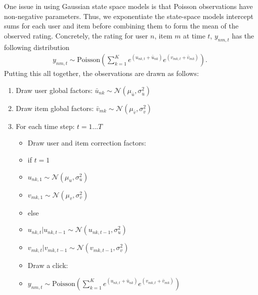 \documentclass{sig-alternate}
\begin{document}
One issue in using Gaussian state space models is that Poisson observations 
have non-negative parameters. Thus, we exponentiate 
the state-space models intercept sums for each user and item
before combining them to form the mean of the observed rating.
Concretely, the rating for user $n$, item $m$ at time $t$, $y_{nm,t}$
has the following distribution
\begin{align*}
y_{nm,t}\sim\text{Poisson}(\sum_{k=1}^K e^{(u_{nk,t} + \bar{u}_{nk})} e^{(v_{mk,t} + \bar{v}_{mk})}).
\end{align*}
Putting this
all together, the observations are
drawn as follows:  
\begin{enumerate}
\item Draw user global factors: $\bar{u}_{nk} \sim \mathcal{N}(\mu_{\bar{u}},\sigma_{\bar{u}}^2)$
\item Draw item global factors: $\bar{v}_{mk} \sim \mathcal{N}(\mu_{\bar{v}},\sigma_{\bar{v}}^2)$
\item For each time step: $t=1\ldots T$
\begin{itemize}
\item[] \hspace{-0.25in}Draw user and item correction factors: \item[] \hspace{-0.20in}if $t=1$
\item[] \hspace{-0.20in}\hspace{0.1in} $u_{nk,1} \sim \mathcal{N}(\mu_u,\sigma_u^2)$
\item[] \hspace{-0.20in}\hspace{0.1in}  $v_{mk,1} \sim \mathcal{N}(\mu_v,\sigma_v^2)$  
\item[] \hspace{-0.20in}else
\item[] \hspace{-0.20in}\hspace{0.1in}   $u_{nk,t}|u_{nk,t-1} \sim \mathcal{N}(u_{nk,t-1}, \sigma_u^2 )$ 
\item[] \hspace{-0.20in}\hspace{0.1in}  $v_{mk,t}|v_{mk,t-1} \sim \mathcal{N}(v_{mk,t-1}, \sigma_v^2 )$  
\item[] \hspace{-0.25in}Draw a click: 
\item[]   \hspace{-0.20in}$y_{nm,t}\sim\text{Poisson}(\sum_{k=1}^K e^{(u_{nk,t} + \bar{u}_{nk})} e^{(v_{mk,t} + \bar{v}_{mk})})$
\end{itemize}
\end{enumerate}
\end{document}
